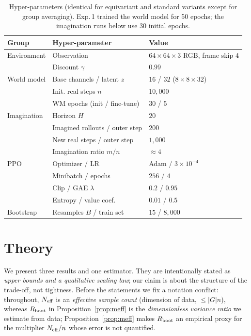 \documentclass[sigconf,anonymous]{acmart}
\begin{document}
\begin{table}[t]
\centering
\caption{Hyper-parameters (identical for equivariant and standard variants
except for group averaging). Exp.\,1 trained the world model for 50 epochs;
the imagination runs below use 30 initial epochs.}
\label{tab:hyper}
\footnotesize\setlength{\tabcolsep}{3pt}
\begin{tabular}{@{}lll@{}}
\toprule
Group & Hyper-parameter & Value \\
\midrule
Environment & Observation & $64\times64\times3$ RGB, frame skip $4$ \\
            & Discount $\gamma$ & $0.99$ \\
World model & Base channels / latent $z$ & $16$ / $32$ ($8\times8\times32$) \\
            & Init. real steps $n$ & $10{,}000$ \\
            & WM epochs (init / fine-tune) & $30$ / $5$ \\
Imagination & Horizon $H$ & $20$ \\
            & Imagined rollouts / outer step & $200$ \\
            & New real steps / outer step & $1{,}000$ \\
            & Imagination ratio $m/n$ & $\approx4$ \\
PPO         & Optimizer / LR & Adam / $3\times10^{-4}$ \\
            & Minibatch / epochs & $256$ / $4$ \\
            & Clip / GAE $\lambda$ & $0.2$ / $0.95$ \\
            & Entropy / value coef. & $0.01$ / $0.5$ \\
Bootstrap   & Resamples $B$ / train set & $15$ / $8{,}000$ \\
\bottomrule
\end{tabular}
\end{table}

\section{Theory}\label{sec:theory}
We present three results and one estimator. They are intentionally stated as
\emph{upper bounds and a qualitative scaling law}; our claim is about the
structure of the trade-off, not tightness. Before the statements we fix a
notation conflict: throughout, $N_{\rm eff}$ is an \emph{effective sample
count} (dimension of data, $\le |G|n$), whereas $R_{\rm boot}$ in
Proposition~\ref{prop:meff} is the \emph{dimensionless variance ratio} we
estimate from data; Proposition~\ref{prop:meff} makes $R_{\rm boot}$ an
empirical proxy for the multiplier $N_{\rm eff}/n$ whose error is not
quantified.
\end{document}
